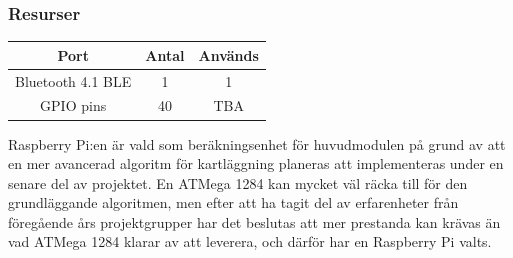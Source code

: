 \documentclass{article}
\begin{document}
\subsubsection{Resurser}

\begin{table}[H]
   \centering
  \begin{tabular}{ | c | c | c | }
    \hline
    \textbf{Port} & \textbf{Antal} & \textbf{Används} \\
    \hline
    Bluetooth 4.1 BLE & 1 & 1\\
    \hline
    GPIO pins & 40 & TBA \\
    \hline
  \end{tabular}
\end{table}

Raspberry Pi:en är vald som beräkningsenhet för huvudmodulen på grund av att en mer avancerad algoritm för kartläggning planeras att implementeras under en senare del av projektet. En ATMega 1284 kan mycket väl räcka till för den grundläggande algoritmen, men efter att ha tagit del av erfarenheter från föregående års projektgrupper har det beslutas att mer prestanda kan krävas än vad ATMega 1284 klarar av att leverera, och därför har en Raspberry Pi valts. 
\end{document}
